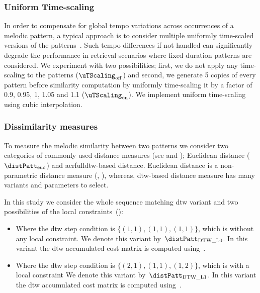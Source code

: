 \subsubsection{Uniform Time-scaling}
\label{sec:patterns_melodic_similarity_time_scaling}

In order to compensate for global tempo variations across occurrences of a melodic pattern, a typical approach is to consider multiple uniformly time-scaled versions of the patterns~\citep{mazzoni2001melody,zhu2003query,kotsifakos2012survey}. Such tempo differences if not handled can significantly degrade the performance in retrieval scenarios where fixed duration patterns are considered. We experiment with two possibilities; first,  we do not apply any time-scaling to the patterns ($\uTScaling_{\mathrm{off}}$) and second, we generate 5 copies of every pattern before similarity computation by uniformly time-scaling it by a factor of 0.9, 0.95, 1, 1.05 and 1.1 ($\uTScaling_{\mathrm{on}}$). We implement uniform time-scaling using cubic interpolation. 


\subsubsection{Dissimilarity measures}
\label{sec:patterns_melodic_similarity_dissimilarity measures}

To measure the melodic similarity between two patterns we consider two categories of commonly used distance measures (see  and ); Euclidean distance ($\distPatt_{\mathrm{euc}}$) and acrfull{dtw}-based distance. Euclidean distance is a non-parametric distance measure (, ), whereas, \gls{dtw}-based distance measure has many variants and parameters to select. 

In this study we consider the whole sequence matching \gls{dtw} variant and two possibilities of the local constraints~():

\begin{itemize}
	\item  Where the \gls{dtw} step condition is $\lbrace(1,1), (1,1), (1,1)\rbrace$, which is without any local constraint. We denote this variant by~$\distPatt_{\mathrm{DTW\_L0}}$. In this variant the \gls{dtw} accumulated cost matrix is computed using~.
	\item Where the \gls{dtw} step condition is $\lbrace(2,1), (1,1), (1,2)\rbrace$, which is with a local constraint We denote this variant by~$\distPatt_{\mathrm{DTW\_L1}}$. In this variant the \gls{dtw} accumulated cost matrix is computed using~.
\end{itemize}

